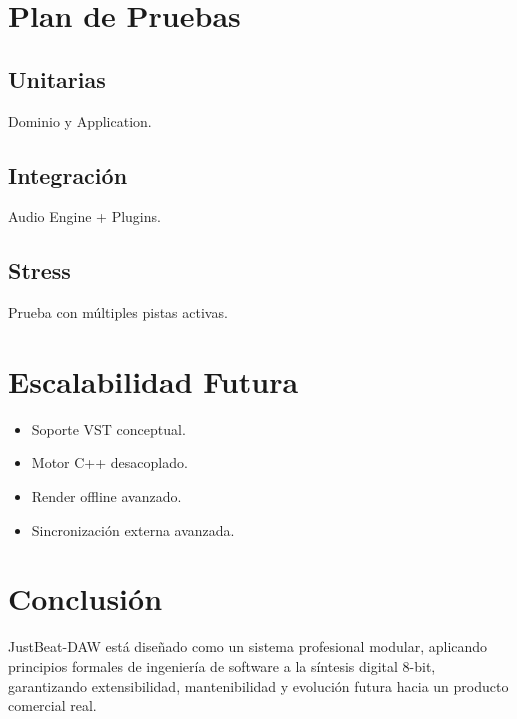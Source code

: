 \documentclass[12pt]{article}
\begin{document}
\section{Plan de Pruebas}

\subsection{Unitarias}
Dominio y Application.

\subsection{Integración}
Audio Engine + Plugins.

\subsection{Stress}
Prueba con múltiples pistas activas.

\section{Escalabilidad Futura}

\begin{itemize}
    \item Soporte VST conceptual.
    \item Motor C++ desacoplado.
    \item Render offline avanzado.
    \item Sincronización externa avanzada.
\end{itemize}

\section{Conclusión}

JustBeat-DAW está diseñado como un sistema profesional modular, aplicando principios formales de ingeniería de software a la síntesis digital 8-bit, garantizando extensibilidad, mantenibilidad y evolución futura hacia un producto comercial real.
\end{document}
